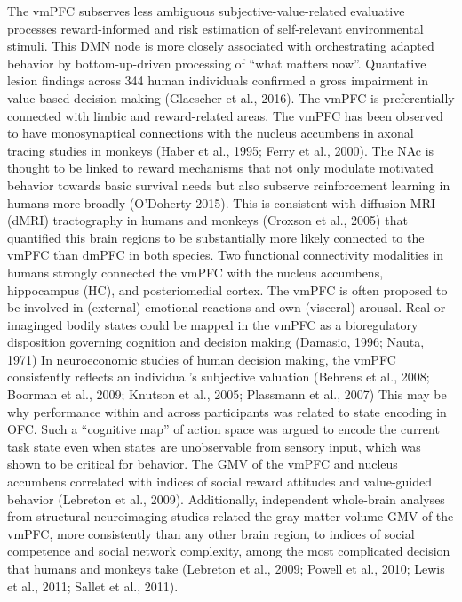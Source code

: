 \documentclass{article} %
\begin{document}
The vmPFC subserves less ambiguous subjective-value-related evaluative processes
reward-informed and risk estimation of self-relevant environmental stimuli.
This DMN node is more closely associated with
orchestrating adapted behavior by bottom-up-driven
processing of “what matters now”.
Quantative lesion findings across 344 human individuals confirmed
a gross impairment in value-based decision making
(Glaescher et al., 2016).
The vmPFC is preferentially connected with limbic and reward-related areas.
The vmPFC has been observed to have monosynaptical connections
with the nucleus accumbens
in axonal tracing studies in monkeys (Haber et al., 1995; Ferry et al., 2000).
The NAc is thought to be linked to reward mechanisms that not
only modulate motivated behavior towards basic survival needs but also
subserve reinforcement learning in humans more broadly
(O'Doherty 2015).
This is consistent with diffusion MRI (dMRI) tractography in humans and monkeys
(Croxson et al., 2005) that
quantified this brain regions to
be substantially more likely connected to the vmPFC than dmPFC in both species.
Two functional connectivity modalities in humans strongly connected
the vmPFC with the nucleus accumbens, hippocampus (HC),
and posteriomedial cortex.
%
The vmPFC is often proposed to be involved in (external) emotional
reactions and own (visceral) arousal.
Real or imaginged bodily states could be mapped in the vmPFC
as a bioregulatory disposition governing cognition
and decision making (Damasio, 1996; Nauta, 1971)
In neuroeconomic studies of human decision making,
the vmPFC consistently reflects an individual’s subjective
valuation (Behrens et al., 2008; Boorman et al., 2009; Knutson et al., 2005; Plassmann et al., 2007)
This may be why performance within and across participants
was related to state encoding in OFC.
Such a “cognitive map” of action space was argued to encode
the current task state even when states are unobservable from sensory input,
which was shown to be critical for behavior.
The GMV of the vmPFC and nucleus accumbens
correlated with indices of social reward attitudes and
value-guided behavior (Lebreton et al., 2009).
Additionally,
independent whole-brain analyses from structural
neuroimaging studies related the gray-matter volume GMV of the vmPFC,
more consistently than any other
brain region, to indices of
social competence and social network complexity,
among the most complicated decision that humans and monkeys take
(Lebreton et al., 2009; Powell et al., 2010; Lewis et al., 2011; Sallet et al., 2011).
%
\end{document}
